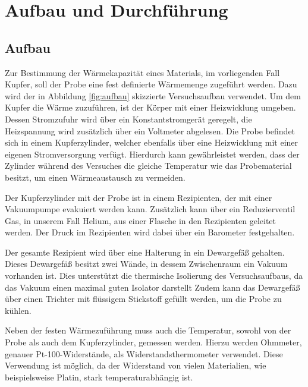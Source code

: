 \section{Aufbau und Durchführung}
\subsection{Aufbau}
\label{sec:Aufbau}

Zur Bestimmung der Wärmekapazität eines Materials, im vorliegenden Fall Kupfer, soll der Probe eine fest definierte Wärmemenge zugeführt werden.
Dazu wird der in Abbildung \ref{fig:aufbau} skizzierte Versuchsaufbau verwendet.
Um dem Kupfer die Wärme zuzuführen, ist der Körper mit einer Heizwicklung umgeben.
Dessen Stromzufuhr wird über ein Konstantstromgerät geregelt, die Heizspannung wird zusätzlich über ein Voltmeter abgelesen.
Die Probe befindet sich in einem Kupferzylinder, welcher ebenfalls über eine Heizwicklung mit einer eigenen Stromversorgung verfügt.
Hierdurch kann gewährleistet werden, dass der Zylinder während des Versuches die gleiche Temperatur wie das Probematerial besitzt, um einen Wärmeaustausch zu vermeiden.

Der Kupferzylinder mit der Probe ist in einem Rezipienten, der mit einer Vakuumpumpe evakuiert werden kann.
Zusätzlich kann über ein Reduzierventil Gas, in unserem Fall Helium, aus einer Flasche in den Rezipienten geleitet werden.
Der Druck im Rezipienten wird dabei über ein Barometer festgehalten.

Der gesamte Rezipient wird über eine Halterung in ein Dewargefäß gehalten.
Dieses Dewargefäß besitzt zwei Wände, in dessem Zwischenraum ein Vakuum vorhanden ist.
Dies unterstützt die thermische Isolierung des Versuchsaufbaus, da das Vakuum einen maximal guten Isolator darstellt %
Zudem kann das Dewargefäß über einen Trichter mit flüssigem Stickstoff gefüllt werden, um die Probe zu kühlen.

Neben der festen Wärmezuführung muss auch die Temperatur, sowohl von der Probe als auch dem Kupferzylinder, gemessen werden.
Hierzu werden Ohmmeter, genauer Pt-100-Widerstände, als Widerstandsthermometer verwendet.
Diese Verwendung ist möglich, da der Widerstand von vielen Materialien, wie beispielsweise Platin, stark temperaturabhängig ist.


